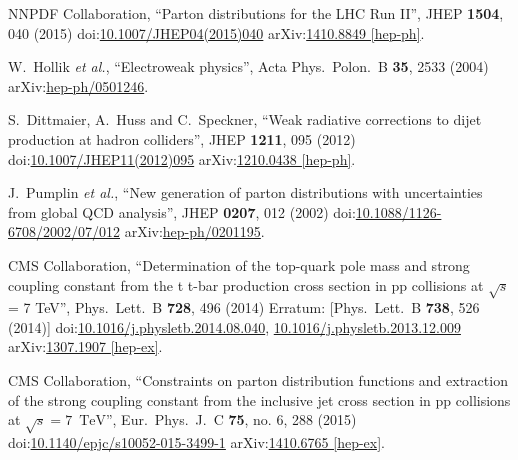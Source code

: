\begin{thebibliography}{99}
NNPDF Collaboration, ``Parton distributions for the LHC Run II'', JHEP {\bf 1504}, 040 (2015) doi:\href{http://dx.doi.org/10.1007/JHEP04(2015)040}{10.1007/JHEP04(2015)040} arXiv:\href{https://arxiv.org/abs/1410.8849}{1410.8849 [hep-ph]}.

W.~Hollik {\it et al.}, ``Electroweak physics'', Acta Phys.\ Polon.\ B {\bf 35}, 2533 (2004) arXiv:\href{https://arxiv.org/abs/hep-ph/0501246}{hep-ph/0501246}.
 
S.~Dittmaier, A.~Huss and C.~Speckner, ``Weak radiative corrections to dijet production at hadron colliders'', JHEP {\bf 1211}, 095 (2012) doi:\href{http://dx.doi.org/10.1007/JHEP11(2012)095}{10.1007/JHEP11(2012)095} arXiv:\href{https://arxiv.org/abs/1210.0438}{1210.0438 [hep-ph]}.


J.~Pumplin {\it et al.}, ``New generation of parton distributions with uncertainties from global QCD analysis'', JHEP {\bf 0207}, 012 (2002) doi:\href{http://dx.doi.org/10.1088/1126-6708/2002/07/012}{10.1088/1126-6708/2002/07/012} arXiv:\href{https://arxiv.org/abs/hep-ph/0201195}{hep-ph/0201195}.



 CMS Collaboration, ``Determination of the top-quark pole mass and strong coupling constant from the t t-bar production cross section in pp collisions at $\sqrt{s}$ = 7 TeV'', Phys.\ Lett.\ B {\bf 728}, 496 (2014) Erratum: [Phys.\ Lett.\ B {\bf 738}, 526 (2014)] doi:\href{http://dx.doi.org/10.1016/j.physletb.2014.08.040}{10.1016/j.physletb.2014.08.040}, \href{http://dx.doi.org/10.1016/j.physletb.2013.12.009}{10.1016/j.physletb.2013.12.009} arXiv:\href{https://arxiv.org/abs/1307.1907}{1307.1907 [hep-ex]}.

CMS Collaboration, ``Constraints on parton distribution functions and extraction of the strong coupling constant from the inclusive jet cross section in pp collisions at $\sqrt{s} = 7$ $\,\text {TeV}$'', Eur.\ Phys.\ J.\ C {\bf 75}, no. 6, 288 (2015) doi:\href{http://dx.doi.org/10.1140/epjc/s10052-015-3499-1}{10.1140/epjc/s10052-015-3499-1} arXiv:\href{https://arxiv.org/abs/1410.6765}{1410.6765 [hep-ex]}.


\end{thebibliography}

